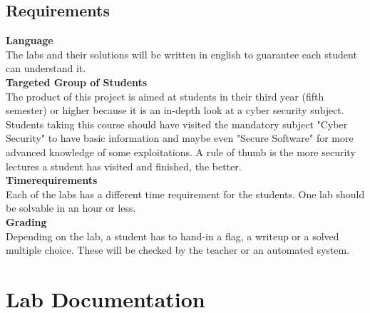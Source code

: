\subsection{Requirements}
\textbf{Language} \\
The labs and their solutions will be written in english to guarantee each student can understand it. \\[0.5cm]
\textbf{Targeted Group of Students} \\
The product of this project is aimed at students in their third year (fifth semester) or higher because it is an in-depth look at a cyber security subject. Students taking this course should have visited the mandatory subject "Cyber Security" to have basic information and maybe even "Secure Software" for more advanced knowledge of some exploitations. A rule of thumb is the more security lectures a student has visited and finished, the better. \\[0.5cm]
\textbf{Timerequirements} \\
Each of the labs has a different time requirement for the students. One lab should be solvable in an hour or less.  \\[0.5cm]
\textbf{Grading} \\
Depending on the lab, a student has to hand-in a flag, a writeup or a solved multiple choice. These will be checked by the teacher or an automated system. \\[0.5cm]

\section{Lab Documentation}

